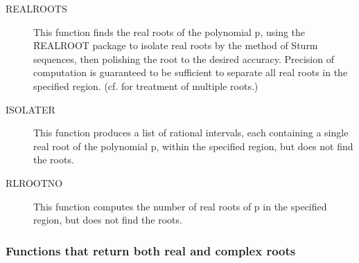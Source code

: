 \begin{description}
 
\item[REALROOTS] This function finds the real roots of the polynomial p,
using the \f{REALROOT} package to isolate real roots by the method of Sturm
sequences, then polishing the root to the desired accuracy.  Precision
of computation is guaranteed to be sufficient to separate all real roots
in the specified region.  (cf.  for treatment of multiple
roots.)

\item[ISOLATER] This function produces a list of rational intervals, each
containing a single real root of the polynomial p, within the specified
region, but does not find the roots.

\item[RLROOTNO] This function computes the number of real roots of p in
the specified region, but does not find the roots.
\end{description}

\subsubsection{Functions that return both real and complex roots}

